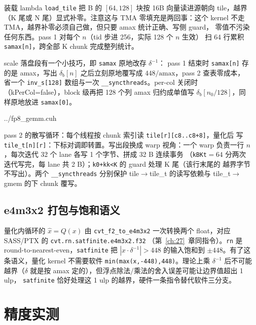 装载 lambda \texttt{load\_tile} 把 B 的 $[64,128]$ 块按 16B 向量读进源朝向
tile，越界（K 尾或 N 尾）显式补零。注意这与 TMA 零填充是两回事：这个
kernel 不走 TMA，越界补零必须自己做，但只要 amax 统计正确、写侧 guard，
零值不污染任何东西。pass 1 对每个 $n$（tid 步进 256，实际 128 个 $n$ 生效）
扫 64 行累积 \texttt{samax[n]}，跨全部 K chunk 完成整列统计。

scale 落盘段有一个小技巧，即 \texttt{samax} 原地改存 $\delta^{-1}$：
pass 1 结束时 \texttt{samax[n]} 存的是 amax，写出
$\delta_b[n]$ 之后立刻原地覆写成 $448/\mathrm{amax}$，pass 2 查表零成本，
省一个 \texttt{inv\_s[128]} 数组与一次 \texttt{\_\_syncthreads}。per-col
关闭时（kPerCol=false），block 级再把 128 个列 amax 归约成单值写
$\delta_b[n_0/128]$，同样原地放进 \texttt{samax[0]}。

\begin{lstinputlisting}[linerange={263-288},firstnumber=auto,
  title={fp8\_gemm.cuh L263-288（pass 2：量化散写 tile\_t + 32B coalesced 写出）}]{../fp8_gemm.cuh}
\end{lstinputlisting}

pass 2 的散写循环：每个线程按 chunk 索引读 \texttt{tile[r][c8..c8+8]}，量化后
写 \texttt{tile\_t[n][r]}：下标对调即转置。写出段换成 warp 视角：一个 warp
负责一行 $n$，每次迭代 32 个 lane 各写 1 个字节、拼成 32 B 连续事务
（\texttt{kBKt}$=64$ 分两次迭代写完，每 lane 共 2 B）；\texttt{k0+kk<K} 的 guard 处理 K 尾（该行末尾的
越界字节不写出）。两个 \texttt{\_\_syncthreads} 分别保护
tile$\to$tile\_t 的读写依赖与 tile\_t$\to$gmem 的下 chunk 覆写。

\subsection{e4m3x2 打包与饱和语义}

量化内循环的 $\hat{x}=Q(x)$ 由 \texttt{cvt\_f2\_to\_e4m3x2} 一次转换两个
float，对应 SASS/PTX 的
\texttt{cvt.rn.\allowbreak satfinite.\allowbreak e4m3x2.\allowbreak f32}
（第~\ref{ch:27}~章同指令）。\texttt{rn}
是 round-to-nearest-even，\texttt{satfinite} 把 $|x\cdot\delta^{-1}|>448$
的输入饱和到 $\pm448$。有了这条语义，量化 kernel 不需要软件
\texttt{min(max(x,-448),448)}。理论上乘 $\delta^{-1}$ 后不可能越界（$\delta$
就是按 amax 定的），但浮点除法/乘法的舍入误差可能让边界值超出 1 ulp，
\texttt{satfinite} 恰好处理这 1 ulp 的越界，硬件一条指令替代软件三分支。

\section{精度实测}\label{sec:34-acc}

